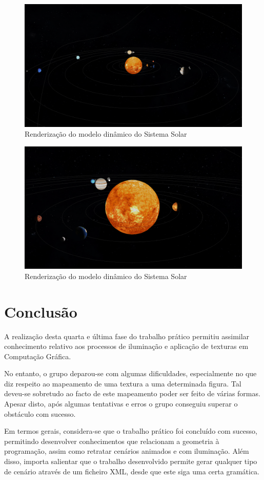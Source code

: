 \documentclass[a4paper, 11pt]{article}
\begin{document}
\begin{figure}[H]
    \centering
    \includegraphics[width=\textwidth]{img/ex3.png}
    \caption{Renderização do modelo dinâmico do Sistema Solar}
\end{figure}

\begin{figure}[H]
    \centering
    \includegraphics[width=\textwidth]{img/ex2.png}
    \caption{Renderização do modelo dinâmico do Sistema Solar}
\end{figure}

\pagebreak

\section{Conclusão}
A realização desta quarta e última fase do trabalho prático permitiu assimilar conhecimento 
relativo aos processos de iluminação e aplicação de texturas em Computação Gráfica. 

No entanto, o grupo deparou-se com algumas dificuldades, especialmente no que diz respeito ao 
mapeamento de uma textura a uma determinada figura. Tal deveu-se sobretudo ao facto de este 
mapeamento poder ser feito de várias formas. Apesar disto, após algumas tentativas e erros o 
grupo conseguiu superar o obstáculo com sucesso.

Em termos gerais, considera-se que o trabalho prático foi concluído com sucesso, permitindo 
desenvolver conhecimentos que relacionam a geometria à programação, assim como retratar 
cenários animados e com iluminação. Além disso, importa salientar que o trabalho desenvolvido 
permite gerar qualquer tipo de cenário através de um ficheiro XML, desde que este siga uma certa 
gramática.
\end{document}
